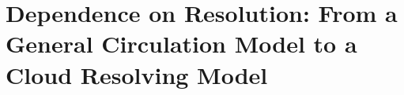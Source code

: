 \documentclass[draft]{agujournal2019}
\begin{document}


\section{Dependence on Resolution: From a General Circulation Model to a Cloud Resolving Model}
\end{document}
